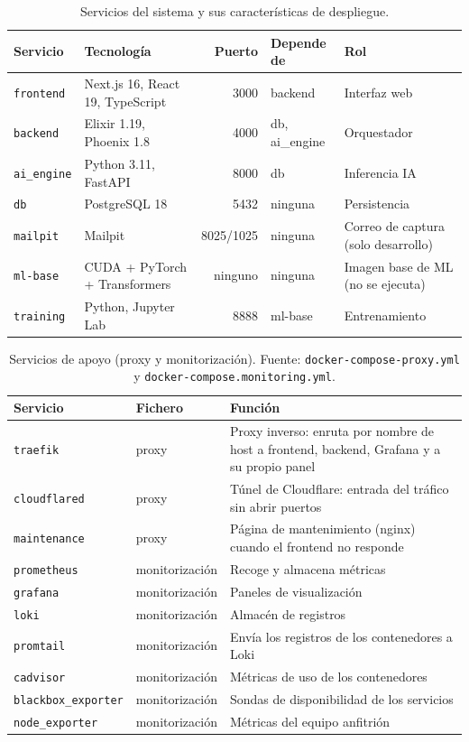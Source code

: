 \begin{table}[h]
\centering
\caption{Servicios del sistema y sus características de despliegue.}
\label{tab:servicios}
\begin{tabular}{lP{3.2cm}rP{2.3cm}P{3.6cm}}
\hline
\textbf{Servicio} & \textbf{Tecnología} & \textbf{Puerto} & \textbf{Depende de} & \textbf{Rol} \\
\hline
\texttt{frontend} & Next.js 16, React 19, TypeScript & 3000 & backend & Interfaz web \\
\texttt{backend} & Elixir 1.19, Phoenix 1.8 & 4000 & db, ai\_engine & Orquestador \\
\texttt{ai\_engine} & Python 3.11, FastAPI & 8000 & db & Inferencia IA \\
\texttt{db} & PostgreSQL 18 & 5432 &  ninguna & Persistencia \\
\texttt{mailpit} & Mailpit & 8025/1025 &  ninguna & Correo de captura (solo desarrollo) \\
\texttt{ml-base} & CUDA + PyTorch + Transformers & ninguno &  ninguna & Imagen base de ML (no se ejecuta) \\
\texttt{training} & Python, Jupyter Lab & 8888 & ml-base & Entrenamiento \\
\hline
\end{tabular}
\end{table}

\begin{table}[!ht]
\centering
\caption{Servicios de apoyo (proxy y monitorización). Fuente: \texttt{docker-compose-proxy.yml} y \texttt{docker-compose.monitoring.yml}.}
\label{tab:servicios-apoyo}
\begin{tabular}{llP{7.2cm}}
\hline
\textbf{Servicio} & \textbf{Fichero} & \textbf{Función} \\
\hline
\texttt{traefik} & proxy & Proxy inverso: enruta por nombre de host a frontend, backend, Grafana y a su propio panel \\
\texttt{cloudflared} & proxy & Túnel de Cloudflare: entrada del tráfico sin abrir puertos \\
\texttt{maintenance} & proxy & Página de mantenimiento (nginx) cuando el frontend no responde \\
\texttt{prometheus} & monitorización & Recoge y almacena métricas \\
\texttt{grafana} & monitorización & Paneles de visualización \\
\texttt{loki} & monitorización & Almacén de registros \\
\texttt{promtail} & monitorización & Envía los registros de los contenedores a Loki \\
\texttt{cadvisor} & monitorización & Métricas de uso de los contenedores \\
\texttt{blackbox\_exporter} & monitorización & Sondas de disponibilidad de los servicios \\
\texttt{node\_exporter} & monitorización & Métricas del equipo anfitrión \\
\hline
\end{tabular}
\end{table}

